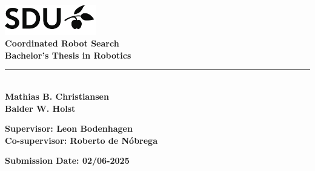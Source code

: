 \begin{titlepage}
    \includegraphics[width=0.3\textwidth]{figures/sdu_logo.png} \\[1cm]

    {\Huge \textbf{Coordinated Robot Search}} \\[0.5cm]
    {\Large \textbf{Bachelor's Thesis in Robotics}} \\[3mm]
    \noindent\rule{\textwidth}{1pt} \\[15mm]
    {\Large \textbf{Mathias B. Christiansen}} \\
    {\Large \textbf{Balder W. Holst}}

    \vfill


    {\large
        \textbf{Supervisor: Leon Bodenhagen} \\
        \textbf{Co-supervisor: Roberto de Nóbrega} \\[3mm]
    }

    {\large
        \textbf{Submission Date: 02/06-2025}
    }

\end{titlepage}

